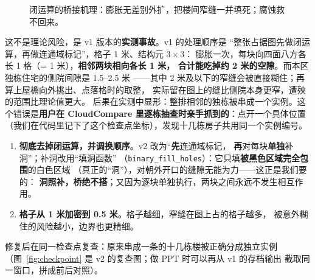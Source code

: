 \begin{figure}[H]
\centering
{}
\caption{闭运算的桥接机理：膨胀无差别外扩，把楼间窄缝一并填死；腐蚀救不回来。}
\label{fig:closing}
\end{figure}

这不是理论风险，是 v1 版本的\textbf{实测事故}。v1 的处理顺序是
``整张占据图先做闭运算，再做连通域标记''，格子 1 米、结构元 $3\times3$：
膨胀一次，每块向四面八方各长 1 格（= 1 米），\textbf{相邻两块相向各长 1 米，
合计能吃掉约 2 米的空隙}。而本区独栋住宅的侧院间隙是 1.5--2.5 米
——其中 2 米及以下的窄缝会被直接糊住；再算上屋檐向外挑出、点落格时的取整，
实际留在图上的缝比侧院本身更窄，遭殃的范围比理论值更大。
后果在实测中显形：整排相邻的独栋被串成一个实例。这个错误是\textbf{用户在
CloudCompare 里逐栋抽查时亲手抓到的}：点开一个具体位置
（我们在代码里记下了这个检查点坐标），发现十几栋房子共用同一个实例编号。

\begin{warnbox}[：v1 $\to$ v2 的两处修复]
\begin{enumerate}
\item \textbf{彻底去掉闭运算，并调换顺序}。v2 改为``\textbf{先}连通域标记，
      \textbf{再}对每块\textbf{单独}补洞''；补洞改用``填洞函数''
      （\texttt{binary\_fill\_holes}）：它只填\textbf{被黑色区域完全包围}的白色区域
      （真正的``洞''），对朝外开口的缝隙无能为力——这正是我们要的：
      \textbf{洞照补，桥绝不搭}；又因为逐块单独执行，两块之间永远不发生相互作用。
\item \textbf{格子从 1 米加密到 0.5 米}。格子越细，窄缝在图上占的格子越多，
      被意外糊住的风险越小，边界也更精细。
\end{enumerate}
修复后在同一检查点复查：原来串成一条的十几栋楼被正确分成独立实例
（图~\ref{fig:checkpoint} 是 v2 的复查图；做 PPT 时可以再从 v1 的存档输出
截取同一窗口，拼成前后对照）。
\end{warnbox}

